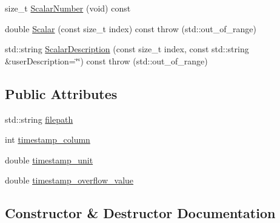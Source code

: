 \begin{DoxyCompactItemize}
\item 
size\+\_\+t \hyperlink{classsvl_filter_source_text_file_types_1_1_file_info_a2b1f2da8026d6544841f211e17a11817}{Scalar\+Number} (void) const 
\item 
double \hyperlink{classsvl_filter_source_text_file_types_1_1_file_info_a8155daef33c8fda48f12dc715e73df7d}{Scalar} (const size\+\_\+t index) const   throw (std\+::out\+\_\+of\+\_\+range)
\item 
std\+::string \hyperlink{classsvl_filter_source_text_file_types_1_1_file_info_a5f0b3f7e2da4f476ff963a90e3eb537a}{Scalar\+Description} (const size\+\_\+t index, const std\+::string \&user\+Description=\char`\"{}\char`\"{}) const   throw (std\+::out\+\_\+of\+\_\+range)
\end{DoxyCompactItemize}
\subsection*{Public Attributes}
\begin{DoxyCompactItemize}
\item 
std\+::string \hyperlink{classsvl_filter_source_text_file_types_1_1_file_info_abc8384306829626692324b74274d1a46}{filepath}
\item 
int \hyperlink{classsvl_filter_source_text_file_types_1_1_file_info_a5d3a2e6aff4aa81a4d2d193986b81c47}{timestamp\+\_\+column}
\item 
double \hyperlink{classsvl_filter_source_text_file_types_1_1_file_info_aa6d0b04ba4092e788a532c3d88a0420e}{timestamp\+\_\+unit}
\item 
double \hyperlink{classsvl_filter_source_text_file_types_1_1_file_info_a55999a312d5bc7effb3d0541c4f7a833}{timestamp\+\_\+overflow\+\_\+value}
\end{DoxyCompactItemize}


\subsection{Constructor \& Destructor Documentation}
\hypertarget{classsvl_filter_source_text_file_types_1_1_file_info_aee7fde8e1afcd0c9c2a6d3d876fcf590}{}
